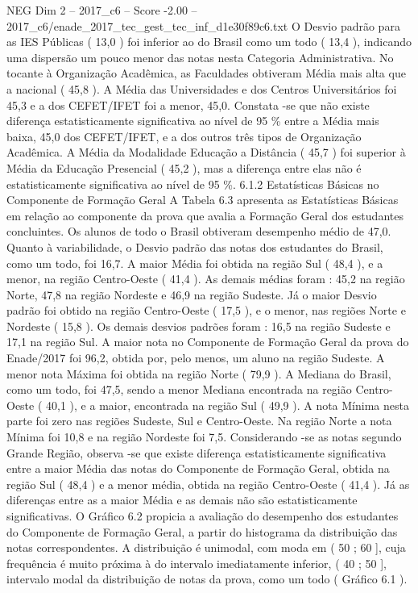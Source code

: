 \begin{textsample}{NEG Dim 2 – 2017\_c6 – Score -2.00 – 2017\_c6/enade\_2017\_tec\_gest\_tec\_inf\_d1e30f89c6.txt}
O Desvio padrão para as IES Públicas ( 13,0 ) foi inferior ao do Brasil como um todo ( 13,4 ), indicando uma dispersão um pouco menor das notas nesta Categoria Administrativa.
No tocante à Organização Acadêmica, as Faculdades obtiveram Média mais alta que a nacional ( 45,8 ).
A Média das Universidades e dos Centros Universitários foi 45,3 e a dos CEFET/IFET foi a menor, 45,0.
Constata -se que não existe diferença estatisticamente significativa ao nível de 95 \% entre a Média mais baixa, 45,0 dos CEFET/IFET, e a dos outros três tipos de Organização Acadêmica.
A Média da Modalidade Educação a Distância ( 45,7 ) foi superior à Média da Educação Presencial ( 45,2 ), mas a diferença entre elas não é estatisticamente significativa ao nível de 95 \%. 6.1.2 Estatísticas Básicas no Componente de Formação Geral A Tabela 6.3 apresenta as Estatísticas Básicas em relação ao componente da prova que avalia a Formação Geral dos estudantes concluintes.
Os alunos de todo o Brasil obtiveram desempenho médio de 47,0.
Quanto à variabilidade, o Desvio padrão das notas dos estudantes do Brasil, como um todo, foi 16,7.
A maior Média foi obtida na região Sul ( 48,4 ), e a menor, na região Centro-Oeste ( 41,4 ).
As demais médias foram : 45,2 na região Norte, 47,8 na região Nordeste e 46,9 na região Sudeste.
Já o maior Desvio padrão foi obtido na região Centro-Oeste ( 17,5 ), e o menor, nas regiões Norte e Nordeste ( 15,8 ).
Os demais desvios padrões foram : 16,5 na região Sudeste e 17,1 na região Sul.
A maior nota no Componente de Formação Geral da prova do Enade/2017 foi 96,2, obtida por, pelo menos, um aluno na região Sudeste.
A menor nota Máxima foi obtida na região Norte ( 79,9 ).
A Mediana do Brasil, como um todo, foi 47,5, sendo a menor Mediana encontrada na região Centro-Oeste ( 40,1 ), e a maior, encontrada na região Sul ( 49,9 ).
A nota Mínima nesta parte foi zero nas regiões Sudeste, Sul e Centro-Oeste.
Na região Norte a nota Mínima foi 10,8 e na região Nordeste foi 7,5.
Considerando -se as notas segundo Grande Região, observa -se que existe diferença estatisticamente significativa entre a maior Média das notas do Componente de Formação Geral, obtida na região Sul ( 48,4 ) e a menor média, obtida na região Centro-Oeste ( 41,4 ).
Já as diferenças entre as a maior Média e as demais não são estatisticamente significativas.
O Gráfico 6.2 propicia a avaliação do desempenho dos estudantes do Componente de Formação Geral, a partir do histograma da distribuição das notas correspondentes.
A distribuição é unimodal, com moda em ( 50 ; 60 ], cuja frequência é muito próxima à do intervalo imediatamente inferior, ( 40 ; 50 ], intervalo modal da distribuição de notas da prova, como um todo ( Gráfico 6.1 ).

\end{textsample}
